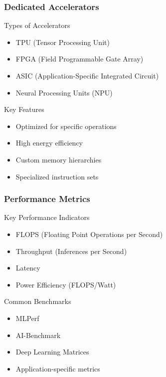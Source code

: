 \documentclass{beamer}
\begin{document}
\begin{frame}
    \frametitle{Dedicated Accelerators}
    \begin{block}{Types of Accelerators}
        \begin{itemize}
            \item TPU (Tensor Processing Unit)
            \item FPGA (Field Programmable Gate Array)
            \item ASIC (Application-Specific Integrated Circuit)
            \item Neural Processing Units (NPU)
        \end{itemize}
    \end{block}
    
    \begin{exampleblock}{Key Features}
        \begin{itemize}
            \item Optimized for specific operations
            \item High energy efficiency
            \item Custom memory hierarchies
            \item Specialized instruction sets
        \end{itemize}
    \end{exampleblock}
\end{frame}

\begin{frame}
    \frametitle{Performance Metrics}
    \begin{block}{Key Performance Indicators}
        \begin{itemize}
            \item FLOPS (Floating Point Operations per Second)
            \item Throughput (Inferences per Second)
            \item Latency
            \item Power Efficiency (FLOPS/Watt)
        \end{itemize}
    \end{block}
    
    \begin{alertblock}{Common Benchmarks}
        \begin{itemize}
            \item MLPerf
            \item AI-Benchmark
            \item Deep Learning Matrices
            \item Application-specific metrics
        \end{itemize}
    \end{alertblock}
\end{frame}
\end{document}

